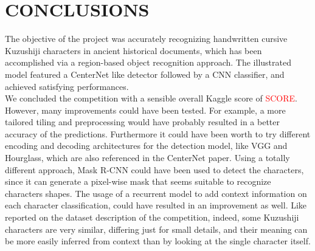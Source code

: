 \section{CONCLUSIONS}
\label{sec:conclusions}

The objective of the project was accurately recognizing handwritten cursive Kuzushiji characters in ancient historical documents, which has been accomplished via a region-based object recognition approach. The illustrated model featured a CenterNet like detector followed by a CNN classifier, and achieved satisfying performances.\\

We concluded the competition with a sensible overall Kaggle score of \textcolor{red}{SCORE}. However, many improvements could have been tested. For example, a more tailored tiling and preprocessing would have probably resulted in a better accuracy of the predictions. Furthermore it could have been worth to try different encoding and decoding architectures for the detection model, like VGG and Hourglass, which are also referenced in the CenterNet paper. Using a totally different approach, Mask R-CNN could have been used to detect the characters, since it can generate a pixel-wise mask that seems suitable to recognize characters shapes. The usage of a recurrent model to add context information on each character classification, could have resulted in an improvement as well. Like reported on the dataset description of the competition, indeed, some Kuzushiji characters are very similar, differing just for small details, and their meaning can be more easily inferred from context than by looking at the single character itself.
